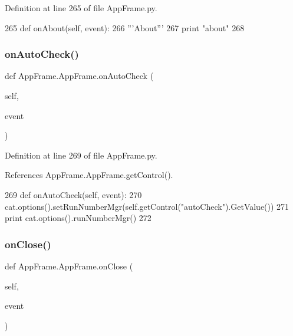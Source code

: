 Definition at line 265 of file App\+Frame.\+py.


\begin{DoxyCode}
265     \textcolor{keyword}{def }onAbout(self, event):
266         \textcolor{stringliteral}{'''About'''}
267         \textcolor{keywordflow}{print} \textcolor{stringliteral}{"about"}
268 
\end{DoxyCode}
\mbox{\label{classAppFrame_1_1AppFrame_a6dbf7445418dc6934ed33664684aad0e}} 
\subsubsection{\texorpdfstring{on\+Auto\+Check()}{onAutoCheck()}}
{\footnotesize\ttfamily def App\+Frame.\+App\+Frame.\+on\+Auto\+Check (\begin{DoxyParamCaption}\item[{}]{self,  }\item[{}]{event }\end{DoxyParamCaption})}



Definition at line 269 of file App\+Frame.\+py.



References App\+Frame.\+App\+Frame.\+get\+Control().


\begin{DoxyCode}
269     \textcolor{keyword}{def }onAutoCheck(self, event):
270         cat.options().setRunNumberMgr(self.getControl(\textcolor{stringliteral}{"autoCheck"}).GetValue())
271         \textcolor{keywordflow}{print} cat.options().runNumberMgr()
272         
\end{DoxyCode}
\mbox{\label{classAppFrame_1_1AppFrame_aa606dfde54071fb64f9ec980433eebdf}} 
\subsubsection{\texorpdfstring{on\+Close()}{onClose()}}
{\footnotesize\ttfamily def App\+Frame.\+App\+Frame.\+on\+Close (\begin{DoxyParamCaption}\item[{}]{self,  }\item[{}]{event }\end{DoxyParamCaption})}

